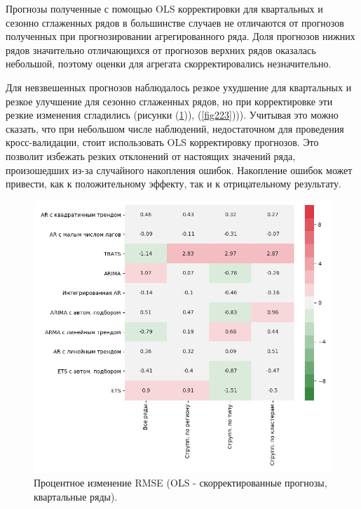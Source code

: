 \documentclass[12pt,a4paper, oneside]{extreport}
\begin{document}
	
	

Прогнозы полученные с помощью OLS  корректировки  для квартальных и сезонно сглаженных рядов в большинстве случаев  не отличаются от прогнозов полученных при прогнозировании агрегированного ряда. Доля  прогнозов нижних рядов значительно отличающихся  от  прогнозов верхних рядов оказалась небольшой, поэтому оценки для агрегата скорректировались незначительно.   

Для невзвешенных  прогнозов наблюдалось  резкое  ухудшение для квартальных и резкое улучшение для сезонно сглаженных рядов, но при корректировке эти резкие изменения сгладились (рисунки (\ref{fig112})), (\ref{fig223}))). Учитывая это можно сказать, что при небольшом числе наблюдений, недостаточном для проведения кросс-валидации, стоит    использовать OLS корректировку   прогнозов. Это позволит избежать резких отклонений от настоящих значений ряда, произошедших из-за случайного накопления ошибок. Накопление ошибок может привести, как  к положительному эффекту, так и к отрицательному результату. 

 
\begin{figure}
	\centering
	\includegraphics[width=0.7\linewidth]{screenshot017}
	\caption{Процентное изменение RMSE (OLS - скорректированные прогнозы, квартальные ряды).
	}
	\label{fig112}
\end{figure}
\end{document}
